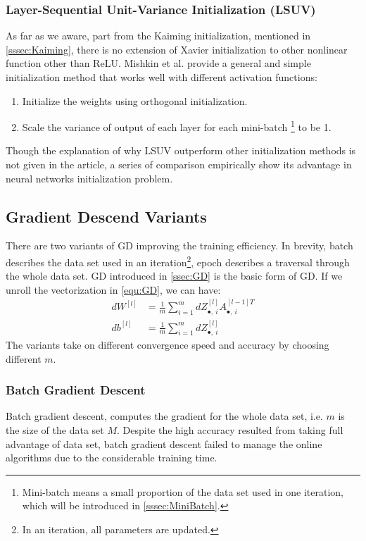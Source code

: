 \subsubsection{Layer-Sequential Unit-Variance Initialization (LSUV)}
As far as we aware, part from the Kaiming initialization, mentioned in 
\autoref{sssec:Kaiming}, there is no extension of Xavier initialization to 
other nonlinear function other than ReLU. Mishkin et al. \parencite{mishkin2015all}
provide a general and simple initialization method that works well with different 
activation functions:
\begin{enumerate}
    \item[1.] Initialize the weights using orthogonal initialization.
    \item[2.] Scale the variance of output of each layer for each mini-batch 
    \footnote{Mini-batch means a small proportion of the data set used in one 
    iteration, which will be introduced in \autoref{sssec:MiniBatch}.} to  
    be 1.
\end{enumerate}
Though the explanation of why LSUV outperform other initialization methods is
not given in the article, a series of comparison empirically show its advantage
in neural networks initialization problem.


\subsection{Gradient Descend Variants}
There are two variants of GD improving the training efficiency. In brevity,
batch describes the data set used in an iteration\footnote{In an iteration, 
all parameters are updated.}, epoch describes a traversal through the whole 
data set. GD introduced in \autoref{ssec:GD} is the basic form of GD. If 
we unroll the vectorization in \autoref{equ:GD}, we can have:
\begin{equation}
    \begin{split}
        dW^{[l]} & = \frac{1}{m}\sum\limits_{i=1}^mdZ_{\bullet,\ i}^{[l]}A_{\bullet,\ i}^{[l-1]T} \\
        db^{[l]} & = \frac{1}{m}\sum\limits_{i=1}^mdZ_{\bullet,\ i}^{[l]}
    \end{split}
\end{equation}  
The variants take on different convergence speed and accuracy by choosing 
different $ m $.

\subsubsection{Batch Gradient Descent}
Batch gradient descent, computes the gradient for the whole data set, i.e. 
$ m $ is the size of the data set $ M $. Despite the high accuracy resulted 
from taking full advantage of data set, batch gradient descent failed to 
manage the online algorithms due to the considerable training time.

